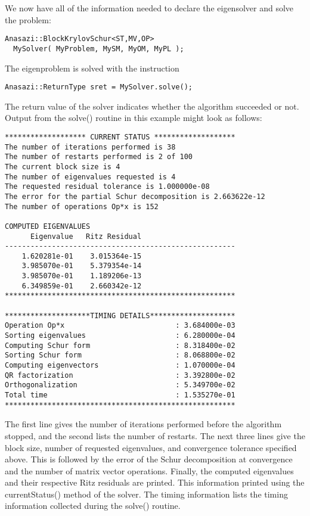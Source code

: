 We now have all of the information needed to declare the eigensolver
and solve the problem:
\begin{verbatim}
Anasazi::BlockKrylovSchur<ST,MV,OP> 
  MySolver( MyProblem, MySM, MyOM, MyPL );
\end{verbatim}
The eigenproblem is solved with the instruction
\begin{verbatim}
Anasazi::ReturnType sret = MySolver.solve();
\end{verbatim}
The return value of the solver indicates whether the algorithm succeeded or not.
Output from the solve() routine in this example might look as follows:
\begin{verbatim}
******************* CURRENT STATUS *******************
The number of iterations performed is 38
The number of restarts performed is 2 of 100
The current block size is 4
The number of eigenvalues requested is 4
The requested residual tolerance is 1.000000e-08
The error for the partial Schur decomposition is 2.663622e-12
The number of operations Op*x is 152

COMPUTED EIGENVALUES                  
      Eigenvalue   Ritz Residual
------------------------------------------------------
    1.620281e-01    3.015364e-15
    3.985070e-01    5.379354e-14
    3.985070e-01    1.189206e-13
    6.349859e-01    2.660342e-12
******************************************************

********************TIMING DETAILS********************
Operation Op*x                          : 3.684000e-03
Sorting eigenvalues                     : 6.280000e-04
Computing Schur form                    : 8.318400e-02
Sorting Schur form                      : 8.068800e-02
Computing eigenvectors                  : 1.070000e-04
QR factorization                        : 3.392800e-02
Orthogonalization                       : 5.349700e-02
Total time                              : 1.535270e-01
******************************************************
\end{verbatim}
The first line gives the number of iterations performed before the algorithm
stopped, and the second lists the number of restarts. The next three lines give
the block size, number of requested eigenvalues, and convergence tolerance
specified above. This is followed by the error of the Schur decomposition at
convergence and the number of matrix vector operations. Finally, the computed
eigenvalues and their respective Ritz residuals are printed. This information
printed using the currentStatus() method of the solver. The timing information
lists the timing information collected during the solve() routine.


